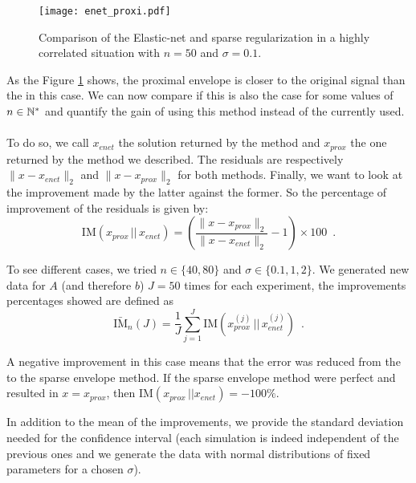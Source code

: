 \begin{center}
    \begin{figure}[H]
        \centering
        \texttt{[image: enet\_proxi.pdf]}
        \caption{Comparison of the Elastic-net and sparse regularization in a highly correlated situation with $n=50$ and $\sigma=0.1$.}
        \label{fig:enet_sp}
    \end{figure}
\end{center}

As the Figure \ref{fig:enet_sp} shows, the proximal envelope is closer to the original signal than the \enet in this case.
We can now compare if this is also the case for some values of $n\in\mathbb{N}^*$ and quantify the gain of using this method instead of the \enet currently used.

\paragraph*{}
To do so, we call $x_{enet}$ the solution returned by the \enet method and $x_{prox}$ the one returned by the method we described. The residuals are respectively $\|x-x_{enet}\|_2$ and $\|x-x_{prox}\|_2$ for both methods. Finally, we want to look at the improvement made by the latter against the former. So the percentage of improvement of the residuals is given by:
\[\mathrm{IM}(x_{prox}\,||\,x_{enet})=\left(\frac{\|x-x_{prox}\|_2}{\|x-x_{enet}\|_2} - 1 \right) \times 100\enspace.\]

To see different cases, we tried $n\in\{40, 80\}$ and $\sigma\in\{0.1,1,2\}$.
We generated new data for $A$ (and therefore $b$) $J=50$ times for each experiment, the improvements percentages showed are defined as
\[\bar{\mathrm{IM}}_{n}(J) = \frac{1}{J}\sum_{j=1}^J \mathrm{IM}(x_{prox}^{(j)}\,||\, x_{enet}^{(j)})\enspace.\]

\begin{remark}
A negative improvement in this case means that the error was reduced from the \enet to the sparse envelope method. If the sparse envelope method were perfect and resulted in $x=x_{prox}$, then $\mathrm{IM}(x_{prox}\,||x_{enet})=-100\%$. \end{remark}

In addition to the mean of the improvements, we provide the standard deviation needed for the confidence interval (each simulation is indeed independent of the previous ones and we generate the data with normal distributions of fixed parameters for a chosen $\sigma$).


